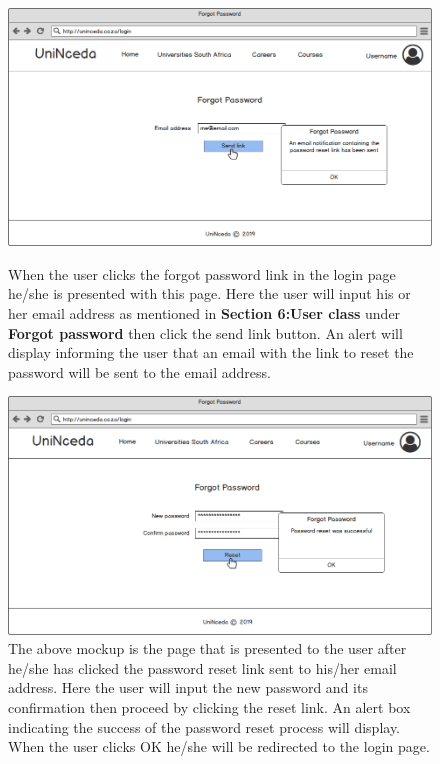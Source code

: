 \documentclass[a4paper, 12pt]{article}
\begin{document}
\setcounter{figure}{0}

\begin{figure}[H]
\centering
\includegraphics[scale=0.4]{LoginPageForgotPassword}
\caption{\small When the user clicks the forgot password link in the login page he/she is presented with this page. Here the user will input his or her email address as mentioned in \textbf{Section 6:User class} under \textbf{Forgot password} then click the send link button. An alert will display informing the user that an email with the link to reset the password will be sent to the email address.}
\label{LoginPageForgotPassword}

\vspace{1cm}

\includegraphics[scale=0.4]{LoginPageForgotPassword(2)}
\caption{\small The above mockup is the page that is presented to the user after he/she has clicked the password reset link sent to his/her email address. Here the user will input the new password and its confirmation then proceed by clicking the reset link. An alert box indicating the success of the password reset process will display. When the user clicks OK he/she will be redirected to the login page.}
\label{LoginPageForgotPassword(2}
\end{figure}
\end{document}
